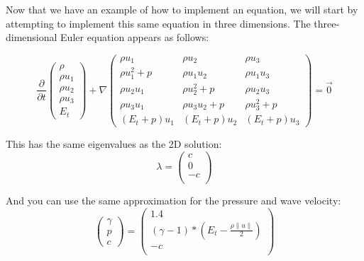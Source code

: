 \documentclass[12pt,letterpaper]{article}
\begin{document}
Now that we have an example of how to implement an equation, we will start by attempting to implement this same equation in three dimensions. The three-dimensional Euler equation appears as follows:

\begin{equation*}
    \frac{\partial}{\partial t}\left(
        \begin{array}{lr}
                    \rho \\
                    \rho u_1 \\
                    \rho u_2 \\
                    \rho u_3 \\
                    E_t 
        \end{array} \right) +
    \nabla
        \begin{pmatrix}
            \rho u_1          & \rho u_2            & \rho u_3\\
            \rho u_1^2 + p    & \rho u_1 u_2        & \rho u_1 u_3 \\
            \rho u_2 u_1      & \rho u_2^2 + p      & \rho u_2 u_3 \\
            \rho u_3 u_1      & \rho u_3 u_2 + p    & \rho u_3^2 + p \\
            (E_t + p) u_1     & (E_t + p) u_2       & (E_t + p) u_3
        \end{pmatrix}  = \vec{0}
\end{equation*}

This has the same eigenvalues as the 2D solution:
\begin{equation*}
    \lambda = \left( \begin{array}{lr}
                     c \\
                     0 \\
                    -c \\
        \end{array} \right)
\end{equation*}

And you can use the same approximation for the pressure and wave velocity:
\begin{equation*}
    \left( \begin{array}{lr}
            \gamma \\ 
            p \\ 
            c \end{array} \right) =
    \left( \begin{array}{lr}
                     1.4 \\
                     (\gamma - 1) * ( E_t - \frac{\rho \|u\|}{2} ) \\
                    -c \\
        \end{array} \right)
\end{equation*}
\end{document}
